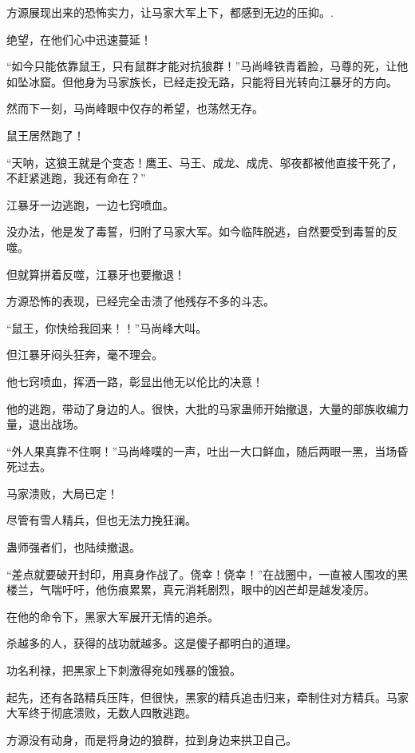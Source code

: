 
\begin{this_body}

方源展现出来的恐怖实力，让马家大军上下，都感到无边的压抑。.

绝望，在他们心中迅速蔓延！

“如今只能依靠鼠王，只有鼠群才能对抗狼群！”马尚峰铁青着脸，马尊的死，让他如坠冰窟。但他身为马家族长，已经走投无路，只能将目光转向江暴牙的方向。

然而下一刻，马尚峰眼中仅存的希望，也荡然无存。

鼠王居然跑了！

“天呐，这狼王就是个变态！鹰王、马王、成龙、成虎、邬夜都被他直接干死了，不赶紧逃跑，我还有命在？”

江暴牙一边逃跑，一边七窍喷血。

没办法，他是发了毒誓，归附了马家大军。如今临阵脱逃，自然要受到毒誓的反噬。

但就算拼着反噬，江暴牙也要撤退！

方源恐怖的表现，已经完全击溃了他残存不多的斗志。

“鼠王，你快给我回来！！”马尚峰大叫。

但江暴牙闷头狂奔，毫不理会。

他七窍喷血，挥洒一路，彰显出他无以伦比的决意！

他的逃跑，带动了身边的人。很快，大批的马家蛊师开始撤退，大量的部族收编力量，退出战场。

“外人果真靠不住啊！”马尚峰噗的一声，吐出一大口鲜血，随后两眼一黑，当场昏死过去。

马家溃败，大局已定！

尽管有雪人精兵，但也无法力挽狂澜。

蛊师强者们，也陆续撤退。

“差点就要破开封印，用真身作战了。侥幸！侥幸！”在战圈中，一直被人围攻的黑楼兰，气喘吁吁，他伤痕累累，真元消耗剧烈，眼中的凶芒却是越发凌厉。

在他的命令下，黑家大军展开无情的追杀。

杀越多的人，获得的战功就越多。这是傻子都明白的道理。

功名利禄，把黑家上下刺激得宛如残暴的饿狼。

起先，还有各路精兵压阵，但很快，黑家的精兵追击归来，牵制住对方精兵。马家大军终于彻底溃败，无数人四散逃跑。

方源没有动身，而是将身边的狼群，拉到身边来拱卫自己。


\end{this_body}
